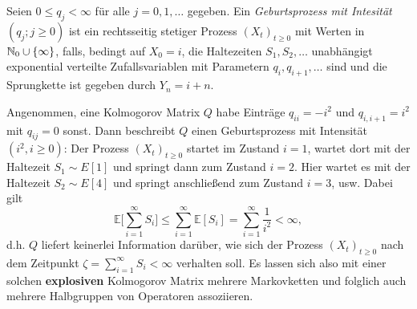 \documentclass[a4paper]{paper}
\numberwithin{equation}{satz}
\begin{document}
\begin{konstr}[Geburtsprozess]
  Seien $0\leq q_j<\infty$ für alle $j=0,1,\dots$ gegeben. Ein \textit{Geburtsprozess mit Intesität $(q_j;j\geq0)$} ist ein rechtsseitig stetiger Prozess $(X_t)_{t\geq0}$ mit Werten in  $\mathbb{N}_0\cup\{\infty\}$, falls, bedingt auf $X_0=i$, die Haltezeiten $S_1,S_2,\dots$ unabhängigt exponential verteilte Zufallsvariablen mit Parametern $q_i,q_{i+1},\dots$ sind und die Sprungkette ist gegeben durch $Y_n=i+n$.
\end{konstr}

\begin{bsp}Angenommen, eine Kolmogorov Matrix $Q$ habe Einträge $q_{ii}=-i^2$ und $q_{i,i+1}=i^2$ mit $q_{ij}=0$ sonst. Dann beschreibt $Q$ einen Geburtsprozess mit Intensität $(i^2, i\geq0)$:  Der Prozess $(X_t)_{t\geq0}$ startet im Zustand $i=1$, wartet dort mit der Haltezeit $S_1\sim E[1]$ und springt dann zum Zustand $i=2$. Hier wartet es mit der Haltezeit $S_2\sim E[4]$ und springt anschließend zum Zustand $i=3$, usw. Dabei gilt $$\mathbb E\Big[\sum_{i=1}^\infty S_i\Big]\leq\sum_{i=1}^\infty \mathbb E[S_i]=\sum_{i=1}^\infty\frac{1}{i^2}< \infty,$$d.h. $Q$ liefert keinerlei Information darüber, wie sich der Prozess $(X_t)_{t\geq0}$ nach dem Zeitpunkt $\zeta=\sum_{i=1}^\infty S_i<\infty$ verhalten soll. Es lassen sich also mit einer solchen \textbf{explosiven} Kolmogorov Matrix mehrere Markovketten und folglich auch mehrere Halbgruppen von Operatoren assoziieren.
\end{bsp}
\end{document}
